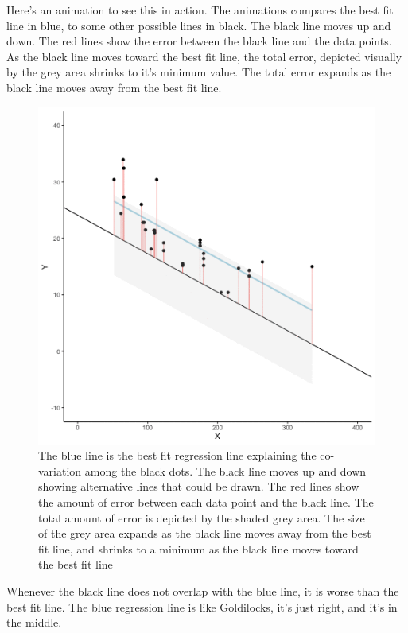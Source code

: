 \documentclass[]{book}
\begin{document}
Here's an animation to see this in action. The animations compares the best fit line in blue, to some other possible lines in black. The black line moves up and down. The red lines show the error between the black line and the data points. As the black line moves toward the best fit line, the total error, depicted visually by the grey area shrinks to it's minimum value. The total error expands as the black line moves away from the best fit line.

\begin{figure}
\centering
\includegraphics{gifs/regression-1.gif}
\caption{\label{fig:3regressionGIF}The blue line is the best fit regression line explaining the co-variation among the black dots. The black line moves up and down showing alternative lines that could be drawn. The red lines show the amount of error between each data point and the black line. The total amount of error is depicted by the shaded grey area. The size of the grey area expands as the black line moves away from the best fit line, and shrinks to a minimum as the black line moves toward the best fit line}
\end{figure}

Whenever the black line does not overlap with the blue line, it is worse than the best fit line. The blue regression line is like Goldilocks, it's just right, and it's in the middle.
\end{document}
